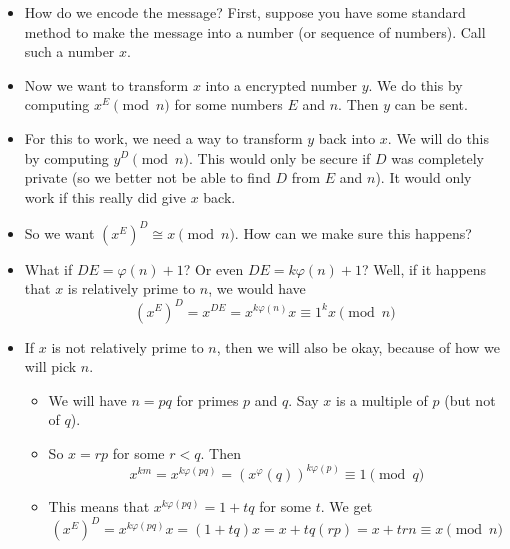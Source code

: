 \documentclass[12pt]{article}
\theoremstyle{plain}
\theoremstyle{definition}
\theoremstyle{remark}
\begin{document}
\begin{itemize}
  \item How do we encode the message?  First, suppose you have some standard method to make the message into a number (or sequence of numbers).  Call such a number $x$.
  \item Now we want to transform $x$ into a encrypted number $y$. We do this by computing $x^E \pmod{n}$ for some numbers $E$ and $n$.  Then $y$ can be sent.
  \item For this to work, we need a way to transform $y$ back into $x$.  We will do this by computing $y^D \pmod{n}$.  This would only be secure if $D$ was completely private (so we better not be able to find $D$ from $E$ and $n$).  It would only work if this really did give $x$ back.
  \item So we want $(x^E)^D \cong x \pmod{n}$.  How can we make sure this happens?
  \item What if $DE = \varphi(n)+1$?  Or even $DE = k\varphi(n)+1$?  Well, if it happens that $x$ is relatively prime to $n$, we would have 
  \[(x^E)^D = x^{DE} = x^{k\varphi(n)}x \equiv 1^k x \pmod{n}\]
  \item If $x$ is not relatively prime to $n$, then we will also be okay, because of how we will pick $n$.  
  \begin{itemize}
    \item We will have $n = pq$ for primes $p$ and $q$.  Say $x$ is a multiple of $p$ (but not of $q$).  
    \item So $x = rp$ for some $r < q$.  Then 
    \[x^{km} = x^{k\varphi(pq)} = (x^\varphi(q))^{k\varphi(p)} \equiv 1 \pmod q\]
    \item This means that $x^{k\varphi(pq)} = 1 + tq$ for some $t$.  We get 
    \[
    (x^E)^D = x^{k\varphi(pq)}x = (1+tq)x = x + tq(rp) = x+trn \equiv x \pmod n
    \]
  \end{itemize}
  

\end{itemize}
\end{document}
